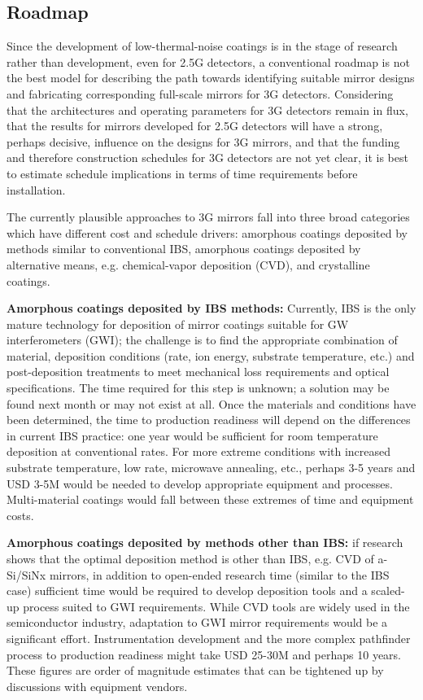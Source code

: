 \subsection{Roadmap}
Since the development of low-thermal-noise coatings is in the stage of research rather than development, even for \ac{2.5G} detectors, a conventional roadmap is not the best model for describing the path towards identifying suitable mirror designs and fabricating corresponding full-scale mirrors for \ac{3G} detectors. Considering that the architectures and operating parameters for \ac{3G} detectors remain in flux, that the results for mirrors developed for \ac{2.5G} detectors will have a strong, perhaps decisive, influence on the designs for \ac{3G} mirrors, and that the funding and therefore construction schedules for \ac{3G} detectors are not yet clear, it is best to estimate schedule implications in terms of time requirements before installation. 

The currently plausible approaches to \ac{3G} mirrors fall into three broad categories which have different cost and schedule drivers: amorphous coatings deposited by methods similar to conventional IBS, amorphous coatings deposited by alternative means, e.g. chemical-vapor deposition (CVD), and crystalline coatings. 

\textbf{Amorphous coatings deposited by IBS methods:} 
Currently, IBS is the only mature technology for deposition of mirror coatings suitable for GW interferometers (GWI); the challenge is to find the appropriate combination of material, deposition conditions (rate, ion energy, substrate temperature, etc.) and post-deposition treatments to meet mechanical loss requirements and optical specifications. The time required for this step is unknown; a solution may be found next month or may not exist at all. Once the materials and conditions have been determined, the time to production readiness will depend on the differences in current IBS practice: one year would be sufficient for room temperature deposition at conventional rates. For more extreme conditions with increased substrate temperature, low rate, microwave annealing, etc., perhaps 3-5 years and USD 3-5M would be needed to develop appropriate equipment and processes. Multi-material coatings would fall between these extremes of time and equipment costs. 

\textbf{Amorphous coatings deposited by methods other than IBS:} 
if research shows that the optimal deposition method is other than IBS, e.g. CVD of a-Si/SiNx mirrors, in addition to open-ended research time (similar to the IBS case) sufficient time would be required to develop deposition tools and a scaled-up process suited to GWI requirements. While CVD tools are widely used in the semiconductor industry, adaptation to GWI mirror requirements would be a significant effort. Instrumentation development and the more complex pathfinder process to production readiness might take USD 25-30M and perhaps 10 years. These figures are order of magnitude estimates that can be tightened up by discussions with equipment vendors. 

